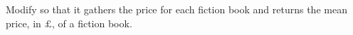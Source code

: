 \begin{problem} %
Modify  so that it gathers the price for each fiction book and returns the mean price, in $\pounds$, of a fiction book.

\end{problem}
\begin{comment}
An alternative approach that is often useful is to first identify the links to relevant pages, then scrape each of these page in succession.
For example, the Federal Reserve releases quarterly data on large banks in the United States at \url{http://www.federalreserve.gov/releases/lbr}.
The following function extracts the four measurements of total consolidated assets for JPMorgan Chase during 2004.

\begin{lstlisting}
def bank_data():
    """Crawl through the Federal Reserve site and extract bank data."""
    # Compile regular expressions for finding certain tags.
    link_finder = re.<<compile>>(r"2004$")
    chase_bank_finder = re.<<compile>>(r"^JPMORGAN CHASE BK")

    # Get the base page and find the URLs to all other relevant pages.
    base_url="https://www.federalreserve.gov/releases/lbr/"
    base_page_source = requests.get(base_url).text
    base_soup = BeautifulSoup(base_page_source, "html.parser")
    link_tags = base_soup.find_all(name='a', href=True, string=link_finder)
    pages = [base_url + tag.attrs["href"] for tag in link_tags]

    # Crawl through the individual pages and record the data.
    chase_assets = []
    for page in pages:
        time.sleep(1)               # PAUSE, then request the page.
        soup = BeautifulSoup(requests.get(page).text, "html.parser")

        # Find the tag corresponding to Chase Banks's consolidated assets.
        temp_tag = soup.find(name="td", string=chase_bank_finder)
        for _ in range(10):
            temp_tag = temp_tag.next_sibling
        # Extract the data, removing commas.
        chase_assets.append(int(temp_tag.string.replace(',', '')))

    return chase_assets
\end{lstlisting}



\end{comment}
